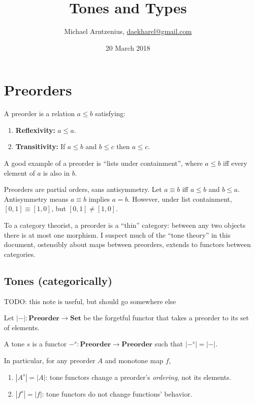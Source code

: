 \documentclass[b5]{rntz}
\title{Tones and Types}
\author{Michael Arntzenius, %
  \href{mailto:daekharel@gmail.com}{daekharel@gmail.com}}
\date{20 March 2018}
\newcommand{\todo}[1]{{\color{red}#1}}
\newcommand{\mb}[1]{\ensuremath{\mathbf{#1}}}
\newcommand{\mc}[1]{\ensuremath{\mathcal{#1}}}
\begin{document}
\maketitle

\section{Preorders}

A preorder is a relation $a \le b$ satisfying:
\begin{enumerate}
\item \textbf{Reflexivity:} $a \le a$.
\item \textbf{Transitivity:} If $a \le b$ and $b \le c$ then $a \le c$.
\end{enumerate}

A good example of a preorder is ``lists under containment'', where $a \le b$ iff
every element of $a$ is also in $b$.

Preorders are partial orders, sans antisymmetry. Let $a \equiv b$ iff $a \le b$
and $b \le a$. Antisymmetry means $a \equiv b$ implies $a = b$. However, under
list containment, $[0,1] \equiv [1,0]$, but $[0,1] \ne [1,0]$.

To a category theorist, a preorder is a ``thin'' category: between any two
objects there is at most one morphism. I suspect much of the ``tone theory'' in
this document, ostensibly about maps between preorders, extends to functors
between categories.



\subsection{Tones (categorically)}

\newcommand{\elemset}[1]{\ensuremath{\mc{U}({#1})}}
\newcommand{\elemsetfn}[0]{\mc{U}}
\renewcommand{\elemset}[1]{\ensuremath{|{#1}|}}
\renewcommand{\elemsetfn}[0]{\elemset{-}}

\todo{TODO: this note is useful, but should go somewhere else}

Let $\elemsetfn{} : \mb{Preorder} \to \mb{Set}$ be the forgetful functor that
takes a preorder to its set of elements.

\begin{definition}
  A tone $s$ is a functor $-^s : \mb{Preorder} \to \mb{Preorder}$ such that
  $\elemset{-^s} = \elemsetfn$.
\end{definition}

In particular, for any preorder $A$ and monotone map $f$,
\begin{enumerate}
\item $|A^s| = |A|$: tone functors change a preorder's \emph{ordering}, not its
  elements.
\item $|f^s| = |f|$: tone functors do not change functions' behavior.
\end{enumerate}
\end{document}

